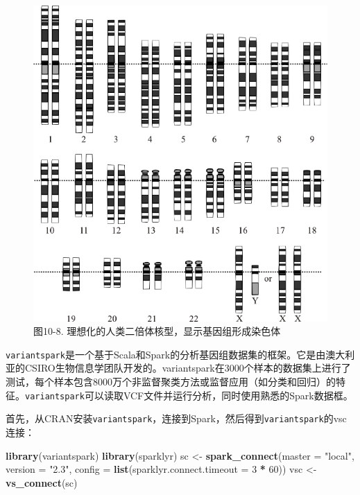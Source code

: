 \documentclass[
]{article}
\newenvironment{Shaded}{\begin{snugshade}}{\end{snugshade}}
\newcommand{\DataTypeTok}[1]{\textcolor[rgb]{0.13,0.29,0.53}{#1}}
\newcommand{\DecValTok}[1]{\textcolor[rgb]{0.00,0.00,0.81}{#1}}
\newcommand{\KeywordTok}[1]{\textcolor[rgb]{0.13,0.29,0.53}{\textbf{#1}}}
\newcommand{\NormalTok}[1]{#1}
\newcommand{\OperatorTok}[1]{\textcolor[rgb]{0.81,0.36,0.00}{\textbf{#1}}}
\newcommand{\StringTok}[1]{\textcolor[rgb]{0.31,0.60,0.02}{#1}}
\begin{document}
\begin{figure}
\centering
\includegraphics{figures/10_8.png}
\caption{图10-8. 理想化的人类二倍体核型，显示基因组形成染色体}
\end{figure}

\texttt{variantspark}是一个基于Scala和Spark的分析基因组数据集的框架。它是由澳大利亚的CSIRO生物信息学团队开发的。variantspark在3000个样本的数据集上进行了测试，每个样本包含8000万个非监督聚类方法或监督应用（如分类和回归）的特征。\texttt{variantspark}可以读取VCF文件并运行分析，同时使用熟悉的Spark数据框。

首先，从CRAN安装\texttt{variantspark}，连接到Spark，然后得到\texttt{variantspark}的vsc连接：

\begin{Shaded}
\begin{Highlighting}[]
\KeywordTok{library}\NormalTok{(variantspark)}
\KeywordTok{library}\NormalTok{(sparklyr)}
\NormalTok{sc <-}\StringTok{ }\KeywordTok{spark_connect}\NormalTok{(}\DataTypeTok{master =} \StringTok{"local"}\NormalTok{, }\DataTypeTok{version =} \StringTok{"2.3"}\NormalTok{, }\DataTypeTok{config =} \KeywordTok{list}\NormalTok{(}\DataTypeTok{sparklyr.connect.timeout =} \DecValTok{3} \OperatorTok{*}\StringTok{ }
\StringTok{    }\DecValTok{60}\NormalTok{))}
\NormalTok{vsc <-}\StringTok{ }\KeywordTok{vs_connect}\NormalTok{(sc)}
\end{Highlighting}
\end{Shaded}
\end{document}

